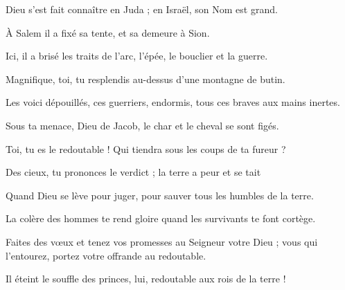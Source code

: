 \item Dieu s'est fait connaître en Juda ; en Israël, son Nom est grand.
\item À Salem il a fixé sa tente, et sa demeure à Sion.
\item Ici, il a brisé les traits de l'arc, l'épée, le bouclier et la guerre.
\item Magnifique, toi, tu resplendis au-dessus d'une montagne de butin.
\item Les voici dépouillés, ces guerriers, endormis, tous ces braves aux mains inertes.
\item Sous ta menace, Dieu de Jacob, le char et le cheval se sont figés.
\item Toi, tu es le redoutable ! Qui tiendra sous les coups de ta fureur ?
\item Des cieux, tu prononces le verdict ; la terre a peur et se tait
\item Quand Dieu se lève pour juger, pour sauver tous les humbles de la terre.
\item La colère des hommes te rend gloire quand les survivants te font cortège.
\item Faites des vœux et tenez vos promesses au Seigneur votre Dieu ; vous qui l'entourez, portez votre offrande au redoutable.
\item Il éteint le souffle des princes, lui, redoutable aux rois de la terre !
